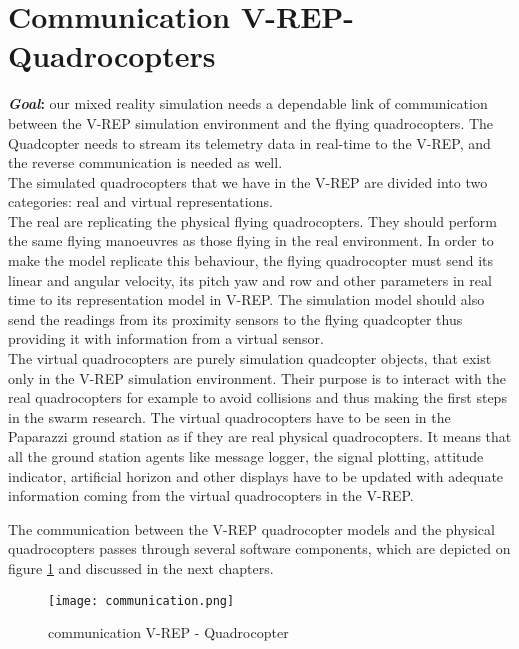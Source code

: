 \section{Communication V-REP-Quadrocopters}
\label{sec:comm}
\textbf{\textit{Goal}:} our mixed reality simulation needs a dependable link of communication between the V-REP simulation environment and the flying quadrocopters. The Quadcopter needs to stream its telemetry data in real-time to the V-REP, and the reverse communication is needed as well.\\
The simulated quadrocopters that we have in the V-REP are divided into two categories: real and virtual representations.\\ 
The real are replicating the physical flying quadrocopters. They should perform the same flying manoeuvres as those flying in the real environment. In order to make the model replicate this behaviour, the flying quadrocopter must send its linear and angular velocity, its pitch yaw and row and other parameters in real time to its representation model in V-REP. The simulation model should also send the readings from its proximity sensors to the flying quadcopter thus providing it with information from a virtual sensor. \\
The virtual quadrocopters are purely simulation quadcopter objects, that exist only in the V-REP simulation environment. Their purpose is to interact with the real quadrocopters for example to avoid collisions and thus making the first steps in the swarm research. The virtual quadrocopters have to be seen in the Paparazzi ground station as if they are real physical quadrocopters. It means that all the ground station agents like message logger, the signal plotting, attitude indicator, artificial horizon and other displays have to be updated with adequate information coming from the virtual quadrocopters in the V-REP.

The communication between the V-REP quadrocopter models and the physical quadrocopters passes through several software components, which are depicted on figure \ref{fig:communication} and discussed in the next chapters.

\begin{figure}[h!]
 \begin{center}
  \texttt{[image: communication.png]}
 \end{center}
  \caption{communication V-REP - Quadrocopter\label{fig:communication}}
\end{figure}


